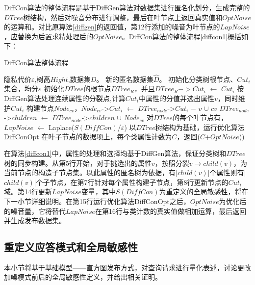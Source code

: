 DiffCon算法的整体流程是基于DiffGen算法对数据集进行匿名化划分，生成完整的$DTree$树结构，然后对噪音分布进行调整，最后在叶节点上返回真实值和$OptNoise$的运算和。对比原算法\ref{diffgen}的返回值，第12行添加的噪音为叶节点的$LapNoise$，应替换为后置求精处理后的$OptNoise$。DiffCon算法的整体流程\ref{diffcon1}概括如下：

\begin{algorithm}
	\caption{DiffCon算法整体流程} 
	\label{diffcon1}
	\begin{algorithmic}[1]
		\REQUIRE 隐私代价$\varepsilon$,树高$Hight$,数据集$D$。
		\ENSURE 新的匿名数据集$\hat{D}$。
		\STATE 初始化分类树根节点、$Cut_{i}$集合，均分$\varepsilon$
		\STATE 初始化$DTree$的根节点$DTree_{R}$，并且$DTree_{R}->Cut_{i}$ $\leftarrow$ $Cut_{i}$
		\STATE 按DiffGen算法处理连续属性的分裂点,计算$Cut_{i}$中属性的分值并选出属性$v$，同时维护$Cut_{i}$
		\STATE 构建节点$Node_{cv}$，$Node_{cv}$->$Cut_{i}$ $\leftarrow$ $DTree_{node}$->$Cut_{i}$ $ - $ $v$ $\cup$ $cv$
		\STATE $DTree_{node}$->$children$ $\leftarrow$ $DTree_{node}$->$children$ $\cup$ $Node_{cv}$
		\ENDFOR
		\ENDIF 
		\ENDFOR
		\ENDFOR
		\STATE 对$DTree$的每个叶节点有，$LapNoise$ $\leftarrow$ Laplace($S(DiffCon)$/$\varepsilon$)
		\STATE 以$DTree$树结构为基础，运行优化算法DiffConOpt
		\RETURN 在叶子节点的数据项上，每个类属性计数为$C$，返回($C$+$OptNoise$))
	\end{algorithmic}
\end{algorithm} 

在算法\ref{diffcon1}中，属性的处理和选择均基于DiffGen算法，保证分类树和$DTree$树的同步构建。从第5行开始，对于挑选出的属性$v$，按照分裂$v$$\rightarrow$$child(v)$，为当前节点的构造子节点集。以此属性的匿名树为依据，有|$child(v)$|个属性则有|$child(v)$|个子节点，在第7行针对每个属性构建子节点，第8行更新节点的$Cut_{i}$域。第14行更新$LapNoise$变量，其中$S(DiffCon)$为重定义的全局敏感性，将在下一小节详细说明。在第15行运行优化算法DiffConOpt之后，$OptNoise$为优化后的噪音量，它将替代$LapNoise$在第16行与类计数的真实值做相加运算，最后返回并生成发布数据集。

\subsection{重定义应答模式和全局敏感性}
本小节将基于基础模型——直方图发布方式，对查询请求进行量化表述，讨论更改加噪模式前后的全局敏感性定义，并给出相关证明。

